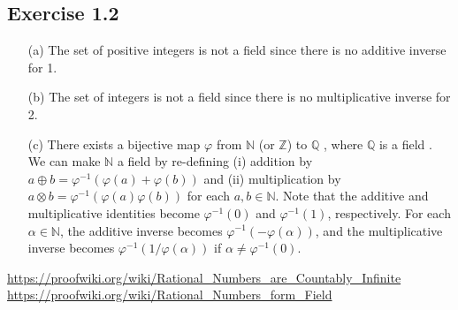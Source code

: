\documentclass{article}
\begin{document}
\subsection{Exercise 1.2}
\begin{itemize}
  \item[(a)] The set of positive integers is not a field since there is no additive inverse for 1.
  \item[(b)] The set of integers is not a field since there is no multiplicative inverse for 2.
  \item[(c)] There exists a bijective map $\varphi$ from $\mathbb{N}$ (or $\mathbb{Z}$) to $\mathbb{Q}$ \cite{Q_countable}, where $\mathbb{Q}$ is a field \cite{Q_field}.
  	We can make $\mathbb{N}$ a field by re-defining (i) addition by $a \oplus b = \varphi^{-1} (\varphi(a) + \varphi(b))$ and (ii) multiplication by $a \otimes b = \varphi^{-1}(\varphi(a)\varphi(b))$ for each $a, b \in \mathbb{N}$.
	Note that the additive and multiplicative identities become $\varphi^{-1}(0)$ and $\varphi^{-1}(1)$, respectively.
	For each $\alpha\in\mathbb{N}$, the additive inverse becomes $\varphi^{-1}(-\varphi(\alpha))$, and the multiplicative inverse becomes $\varphi^{-1}(1/\varphi(\alpha))$ if $\alpha\ne\varphi^{-1}(0)$.
\end{itemize}

\begin{thebibliography}{9}
 \url{https://proofwiki.org/wiki/Rational_Numbers_are_Countably_Infinite}
 \url{https://proofwiki.org/wiki/Rational_Numbers_form_Field}
\end{thebibliography}
\end{document}
